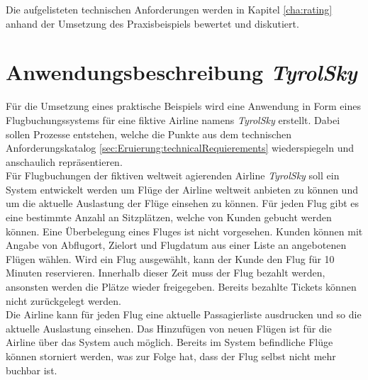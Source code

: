 Die aufgelisteten technischen Anforderungen werden in Kapitel \ref{cha:rating} anhand der Umsetzung des Praxisbeispiels bewertet und diskutiert. 

\section{Anwendungsbeschreibung \textit{TyrolSky}}
Für die Umsetzung eines praktische Beispiels wird eine Anwendung in Form eines Flugbuchungssystems für eine fiktive Airline namens \textit{TyrolSky} erstellt. Dabei sollen Prozesse entstehen, welche die Punkte aus dem technischen Anforderungskatalog \ref{sec:Eruierung:technicalRequierements} wiederspiegeln und anschaulich repräsentieren. \\
Für Flugbuchungen der fiktiven weltweit agierenden Airline \textit{TyrolSky} soll ein System entwickelt werden um Flüge der Airline weltweit anbieten zu können und um die aktuelle Auslastung der Flüge einsehen zu können. Für jeden Flug gibt es eine bestimmte Anzahl an Sitzplätzen, welche von Kunden gebucht werden können. Eine Überbelegung eines Fluges ist nicht vorgesehen. Kunden können mit Angabe von Abflugort, Zielort und Flugdatum aus einer Liste an angebotenen Flügen wählen. Wird ein Flug ausgewählt, kann der Kunde den Flug für 10 Minuten reservieren. Innerhalb dieser Zeit muss der Flug bezahlt werden, ansonsten werden die Plätze wieder freigegeben. Bereits bezahlte Tickets können nicht zurückgelegt werden.  \\
Die Airline kann für jeden Flug eine aktuelle Passagierliste ausdrucken und so die aktuelle Auslastung einsehen. Das Hinzufügen von neuen Flügen ist für die Airline über das System auch möglich. Bereits im System befindliche Flüge können storniert werden, was zur Folge hat, dass der Flug selbst nicht mehr buchbar ist. \\

